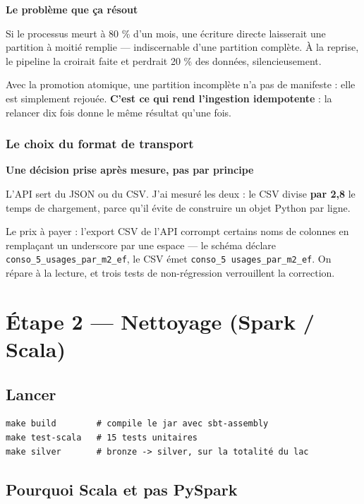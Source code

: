 \documentclass[11pt,a4paper]{article}
\newcommand{\cmd}[1]{\texttt{\small #1}}
\newcommand{\titrebloc}[1]{\textbf{\color{encre}#1}\par\vspace{0.25em}}
\begin{document}
\begin{pourquoi}
\titrebloc{Le problème que ça résout}
Si le processus meurt à 80 \% d'un mois, une écriture directe laisserait une
partition à moitié remplie — indiscernable d'une partition complète. À la
reprise, le pipeline la croirait faite et perdrait 20 \% des données,
silencieusement.

Avec la promotion atomique, une partition incomplète n'a pas de manifeste :
elle est simplement rejouée. \textbf{C'est ce qui rend l'ingestion
idempotente} : la relancer dix fois donne le même résultat qu'une fois.
\end{pourquoi}

\subsubsection{Le choix du format de transport}

\begin{pourquoi}
\titrebloc{Une décision prise après mesure, pas par principe}
L'API sert du JSON ou du CSV. J'ai mesuré les deux : le CSV divise
\textbf{par 2,8} le temps de chargement, parce qu'il évite de construire un
objet Python par ligne.

Le prix à payer : l'export CSV de l'API corrompt certains noms de colonnes en
remplaçant un underscore par une espace — le schéma déclare
\cmd{conso\_5\_usages\_par\_m2\_ef}, le CSV émet
\cmd{conso\_5 usages\_par\_m2\_ef}. On répare à la lecture, et trois tests de
non-régression verrouillent la correction.
\end{pourquoi}

\newpage
\section{Étape 2 — Nettoyage (Spark / Scala)}

\subsection{Lancer}

\begin{lstlisting}[style=sh]
make build        # compile le jar avec sbt-assembly
make test-scala   # 15 tests unitaires
make silver       # bronze -> silver, sur la totalité du lac
\end{lstlisting}

\subsection{Pourquoi Scala et pas PySpark}
\end{document}
